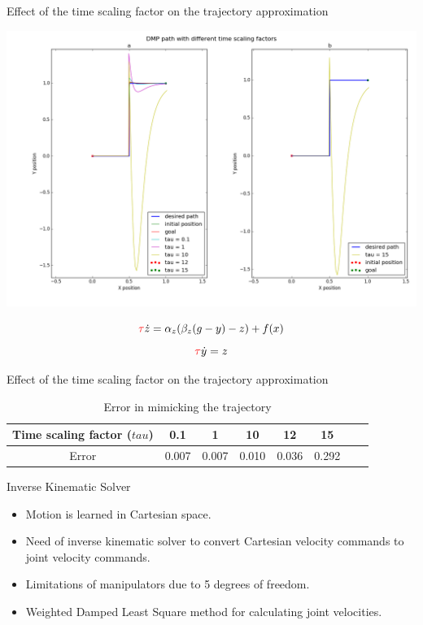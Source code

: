 \documentclass{beamer}
\begin{document}
	
	\begin{frame}
		Effect of the time scaling factor on the trajectory approximation
		\begin{center}
		\includegraphics[scale=0.24]{images/tau_}
		\end{center}
		\begin{equation}
		\color{red}\tau \color{black}\dot{z} = \alpha_{z}(\beta_{z}(g - y) - z) + f(x)
		\end{equation}
		\begin{equation}
		\color{red}\tau \color{black} \dot{y} = z 
		\end{equation}

	\end{frame}
	
	\begin{frame}
		Effect of the time scaling factor on the trajectory approximation
		\begin{center}
			\begin{table}[H]
				\centering
				\begin{tabular}{| c | c | c | c | c | c | c | c |}	
					\hline
					Time scaling factor ($tau$) & 0.1 & 1 & 10 & 12 & 15 \\       
					\hline
					Error & 0.007 & 0.007 & 0.010 & 0.036 & 0.292   \\
					\hline
				\end{tabular}
				\caption{Error in mimicking the trajectory}
			\end{table}\label{_tau_e}
		\end{center}
	\end{frame}
	
	\begin{frame}{Inverse Kinematic Solver}
		\begin{itemize}
			\item Motion is learned in Cartesian space. 
			\item Need of inverse kinematic solver to convert Cartesian velocity commands to joint velocity commands. 
			\item Limitations of manipulators due to 5 degrees of freedom.
			\item Weighted Damped Least Square method for calculating joint velocities.
		\end{itemize}	
	\end{frame}
	
\end{document}
